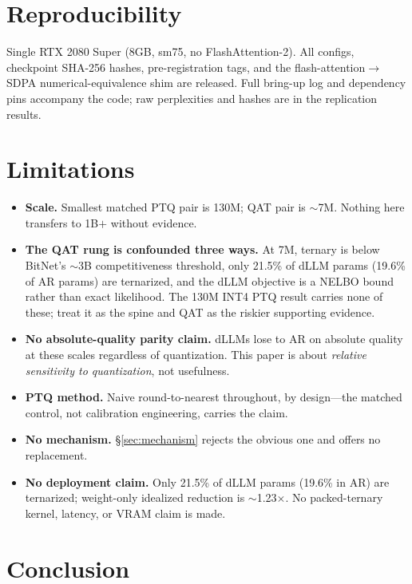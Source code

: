 \documentclass[11pt]{article}
\begin{document}
\section{Reproducibility}

Single RTX 2080 Super (8GB, sm75, no FlashAttention-2). All configs, checkpoint SHA-256 hashes, pre-registration tags, and the flash-attention$\to$SDPA numerical-equivalence shim are released. Full bring-up log and dependency pins accompany the code; raw perplexities and hashes are in the replication results.

\section{Limitations}
\label{sec:limitations}

\begin{itemize}
\item \textbf{Scale.} Smallest matched PTQ pair is 130M; QAT pair is $\sim$7M. Nothing here transfers to 1B$+$ without evidence.
\item \textbf{The QAT rung is confounded three ways.} At 7M, ternary is below BitNet's $\sim$3B competitiveness threshold, only 21.5\% of dLLM params (19.6\% of AR params) are ternarized, and the dLLM objective is a NELBO bound rather than exact likelihood. The 130M INT4 PTQ result carries none of these; treat it as the spine and QAT as the riskier supporting evidence.
\item \textbf{No absolute-quality parity claim.} dLLMs lose to AR on absolute quality at these scales regardless of quantization. This paper is about \emph{relative sensitivity to quantization}, not usefulness.
\item \textbf{PTQ method.} Naive round-to-nearest throughout, by design---the matched control, not calibration engineering, carries the claim.
\item \textbf{No mechanism.} \S\ref{sec:mechanism} rejects the obvious one and offers no replacement.
\item \textbf{No deployment claim.} Only 21.5\% of dLLM params (19.6\% in AR) are ternarized; weight-only idealized reduction is $\sim$1.23$\times$. No packed-ternary kernel, latency, or VRAM claim is made.
\end{itemize}

\section{Conclusion}
\end{document}
